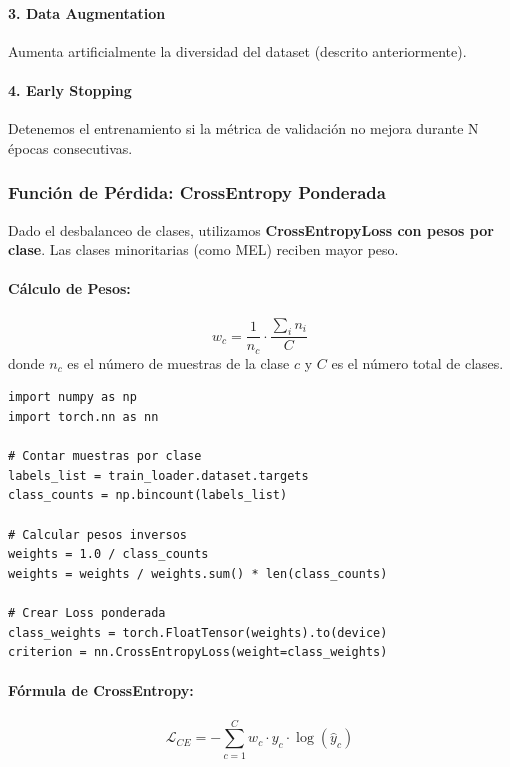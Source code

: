 \documentclass[12pt,a4paper]{article}
\begin{document}
\paragraph{3. Data Augmentation}
Aumenta artificialmente la diversidad del dataset (descrito anteriormente).

\paragraph{4. Early Stopping}
Detenemos el entrenamiento si la métrica de validación no mejora durante N épocas consecutivas.

\subsubsection{Función de Pérdida: CrossEntropy Ponderada}

Dado el desbalanceo de clases, utilizamos \textbf{CrossEntropyLoss con pesos por clase}. Las clases minoritarias (como MEL) reciben mayor peso.

\paragraph{Cálculo de Pesos:}
\begin{equation}
w_c = \frac{1}{n_c} \cdot \frac{\sum_i n_i}{C}
\end{equation}
donde $n_c$ es el número de muestras de la clase $c$ y $C$ es el número total de clases.

\begin{lstlisting}[caption={Cálculo de pesos para CrossEntropyLoss}]
import numpy as np
import torch.nn as nn

# Contar muestras por clase
labels_list = train_loader.dataset.targets
class_counts = np.bincount(labels_list)

# Calcular pesos inversos
weights = 1.0 / class_counts
weights = weights / weights.sum() * len(class_counts)

# Crear Loss ponderada
class_weights = torch.FloatTensor(weights).to(device)
criterion = nn.CrossEntropyLoss(weight=class_weights)
\end{lstlisting}

\paragraph{Fórmula de CrossEntropy:}
\begin{equation}
\mathcal{L}_{CE} = -\sum_{c=1}^{C} w_c \cdot y_c \cdot \log(\hat{y}_c)
\end{equation}
\end{document}
